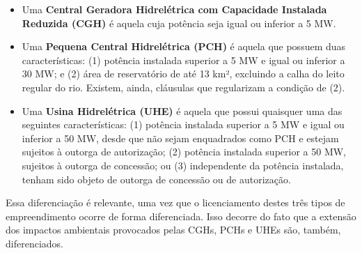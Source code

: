 \documentclass[grad,numbers]{coppe}
\providecommand{\tightlist}{%
  \setlength{\itemsep}{0pt}\setlength{\parskip}{0pt}}
\begin{document}
  \begin{itemize}
  \tightlist
  \item
    Uma \textbf{Central Geradora Hidrelétrica com Capacidade Instalada Reduzida (CGH)} é aquela cuja potência seja igual ou inferior a 5 MW.
  \item
    Uma \textbf{Pequena Central Hidrelétrica (PCH)} é aquela que possuem duas características: (1) potência instalada superior a 5 MW e igual ou inferior a 30 MW; e (2) área de reservatório de até 13 km², excluindo a calha do leito regular do rio. Existem, ainda, cláusulas que regularizam a condição de (2).
  \item
    Uma \textbf{Usina Hidrelétrica (UHE)} é aquela que possui quaisquer uma das seguintes características: (1) potência instalada superior a 5 MW e igual ou inferior a 50 MW, desde que não sejam enquadrados como PCH e estejam sujeitos à outorga de autorização; (2) potência instalada superior a 50 MW, sujeitos à outorga de concessão; ou (3) independente da potência instalada, tenham sido objeto de outorga de concessão ou de autorização.
  \end{itemize}
  Essa diferenciação é relevante, uma vez que o licenciamento destes três tipos de empreendimento ocorre de forma diferenciada. Isso decorre do fato que a extensão dos impactos ambientais provocados pelas CGHs, PCHs e UHEs são, também, diferenciados.
\end{document}
